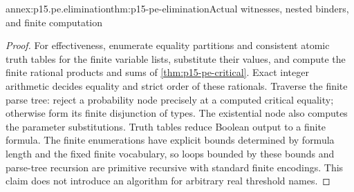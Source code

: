 \begin{annexitem}{annex:p15.pe.elimination}{thm:p15-pe-elimination}{Actual witnesses, nested binders, and finite computation}
\begin{proof}
For effectiveness, enumerate equality partitions and consistent atomic
truth tables for the finite variable lists, substitute their values,
and compute the finite rational products and sums of
\cref{thm:p15-pe-critical}. Exact integer arithmetic decides equality
and strict order of these rationals. Traverse the finite parse tree:
reject a probability node precisely at a computed critical equality;
otherwise form its finite disjunction of types. The existential node
also computes the parameter substitutions. Truth tables reduce
Boolean output to a finite formula. The finite enumerations have
explicit bounds determined by formula length and the fixed finite
vocabulary, so loops bounded by these bounds and parse-tree recursion
are primitive recursive with standard finite encodings. This claim
does not introduce an algorithm for arbitrary real threshold names.
\end{proof}
\end{annexitem}

